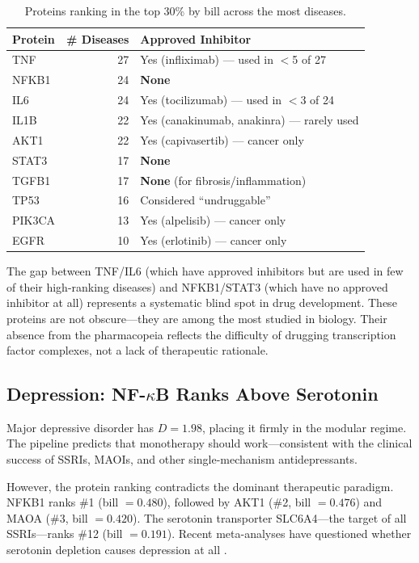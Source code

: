 \documentclass[11pt,a4paper]{article}
\begin{document}
\begin{table}[h]
\centering
\caption{Proteins ranking in the top 30\% by bill across the most diseases.}
\label{tab:cross}
\begin{tabular}{l r l}
\toprule
\textbf{Protein} & \textbf{\# Diseases} & \textbf{Approved Inhibitor} \\
\midrule
TNF & 27 & Yes (infliximab) --- used in $<$5 of 27 \\
NFKB1 & 24 & \textbf{None} \\
IL6 & 24 & Yes (tocilizumab) --- used in $<$3 of 24 \\
IL1B & 22 & Yes (canakinumab, anakinra) --- rarely used \\
AKT1 & 22 & Yes (capivasertib) --- cancer only \\
STAT3 & 17 & \textbf{None} \\
TGFB1 & 17 & \textbf{None} (for fibrosis/inflammation) \\
TP53 & 16 & Considered ``undruggable'' \\
PIK3CA & 13 & Yes (alpelisib) --- cancer only \\
EGFR & 10 & Yes (erlotinib) --- cancer only \\
\bottomrule
\end{tabular}
\end{table}

The gap between TNF/IL6 (which have approved inhibitors but are used in few of their high-ranking diseases) and NFKB1/STAT3 (which have no approved inhibitor at all) represents a systematic blind spot in drug development. These proteins are not obscure---they are among the most studied in biology. Their absence from the pharmacopeia reflects the difficulty of drugging transcription factor complexes, not a lack of therapeutic rationale.

\subsection{Depression: NF-\texorpdfstring{$\kappa$}{k}B Ranks Above Serotonin}

Major depressive disorder has $D = 1.98$, placing it firmly in the modular regime. The pipeline predicts that monotherapy should work---consistent with the clinical success of SSRIs, MAOIs, and other single-mechanism antidepressants.

However, the protein ranking contradicts the dominant therapeutic paradigm. NFKB1 ranks \#1 (bill $= 0.480$), followed by AKT1 (\#2, bill $= 0.476$) and MAOA (\#3, bill $= 0.420$). The serotonin transporter SLC6A4---the target of all SSRIs---ranks \#12 (bill $= 0.191$). Recent meta-analyses have questioned whether serotonin depletion causes depression at all \citep{moncrieff2022}.
\end{document}
